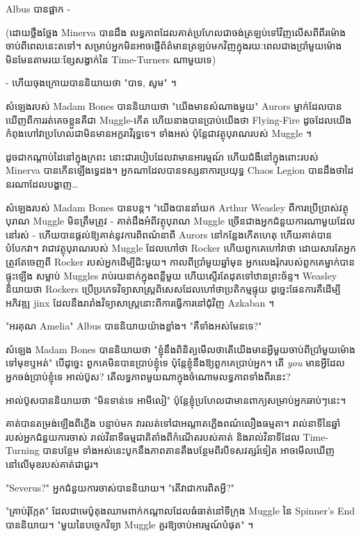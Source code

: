 Albus បានផ្អាក -

(ដោយថ្លឹងថ្លែង Minerva បានដឹង លទ្ធភាពដែលគាត់ប្រហែលជាចង់ត្រឡប់ទៅវិញលើសពីពីរម៉ោងចាប់ពីពេលនេះតទៅ។ សម្រាប់អ្នកមិនអាចផ្ញើព័ត៌មានត្រឡប់មកវិញក្នុងរយៈពេលជាងប្រាំមួយម៉ោង មិនមែនតាមរយៈខ្សែសង្វាក់នៃ Time-Turners ណាមួយទេ)

- ហើយចុងក្រោយបាននិយាយថា "បាទ, សូម" ។

សំឡេងរបស់ Madam Bones បាននិយាយថា "យើងមានសំណាងមួយ" Aurors ម្នាក់ដែលបានឃើញពីការរត់គេចខ្លួនគឺជា Muggle-កើត ហើយនាងបានប្រាប់យើងថា Flying-Fire ដូចដែលយើងកំពុងហៅវាប្រហែលជាមិនមានអក្ខរាវិរុទ្ធទេ។ ទាំងអស់ ប៉ុន្តែជាវត្ថុបុរាណរបស់ Muggle ។

ដូចជាកណ្តាប់ដៃនៅក្នុងក្រពះ នោះជារបៀបដែលវាមានអារម្មណ៍ ហើយជំងឺនៅក្នុងពោះរបស់ Minerva បានកើនឡើងទ្វេដង។ អ្នក​ណា​ដែល​បាន​ទស្សនា​ការ​ប្រយុទ្ធ Chaos Legion បាន​ដឹង​ថា​ដៃ​នរណា​ដែល​បង្ហាញ…

សំឡេងរបស់ Madam Bones បានបន្ត។ "យើងបាននាំយក Arthur Weasley ពីការប្រើប្រាស់វត្ថុបុរាណ Muggle មិនត្រឹមត្រូវ - គាត់ដឹងអំពីវត្ថុបុរាណ Muggle ច្រើនជាងអ្នកជំនួយការណាមួយដែលនៅរស់ - ហើយបានផ្តល់ឱ្យគាត់នូវការពិពណ៌នាពី Aurors នៅកន្លែងកើតហេតុ ហើយគាត់បានបំបែកវា។ វាជាវត្ថុបុរាណរបស់ Muggle ដែលហៅថា Rocker ហើយពួកគេហៅវាថា ដោយសារតែអ្នកត្រូវតែចេញពី Rocker របស់អ្នកដើម្បីជិះមួយ។ កាលពីប្រាំមួយឆ្នាំមុន អ្នកលេងរ៉ុករបស់ពួកគេម្នាក់បានផ្ទុះឡើង សម្លាប់ Muggles រាប់រយនាក់ក្នុងពន្លឺមួយ ហើយស្ទើរតែដុតទៅឋានព្រះច័ន្ទ។ Weasley និយាយថា Rockers ប្រើប្រភេទវិទ្យាសាស្ត្រពិសេសដែលហៅថាប្រតិកម្មផ្ទុយ ដូច្នេះផែនការគឺដើម្បីអភិវឌ្ឍ jinx ដែលនឹងរារាំងវិទ្យាសាស្រ្តនោះពីការធ្វើការនៅជុំវិញ Azkaban ។

"អរគុណ Amelia" Albus បាននិយាយយ៉ាងខ្លាំង។ "គឺទាំងអស់មែនទេ?"

សំឡេង Madam Bones បាននិយាយថា "ខ្ញុំនឹងពិនិត្យមើលថាតើយើងមានអ្វីមួយចាប់ពីប្រាំមួយម៉ោងទៅមុខឬអត់" បើដូច្នេះ ពួកគេមិនបានប្រាប់ខ្ញុំទេ ប៉ុន្តែខ្ញុំនឹងឱ្យពួកគេប្រាប់អ្នក។ តើ \emph{you} មានអ្វីដែលអ្នកចង់ប្រាប់ខ្ញុំទេ អាល់ប៊ូស? តើ​លទ្ធភាព​មួយ​ណា​ក្នុង​ចំណោម​លទ្ធភាព​ទាំង​ពីរ​នេះ?

អាល់ប៊ូសបាននិយាយថា "មិនទាន់ទេ អាមីលៀ" ប៉ុន្តែខ្ញុំប្រហែលជាមានពាក្យសម្រាប់អ្នកឆាប់ៗនេះ។

គាត់បានតម្រង់ឡើងពីភ្លើង បន្ទាប់មក វារលត់ទៅជាអណ្តាតភ្លើងពណ៌លឿងធម្មតា។ រាល់នាទីនៃឆ្នាំរបស់អ្នកជំនួយការចាស់ រាល់វិនាទីធម្មជាតិតាំងពីកំណើតរបស់គាត់ និងរាល់វិនាទីដែល Time-Turning បានបន្ថែម ទាំងអស់នេះបូកនឹងភាពតានតឹងបន្ថែមពីរបីទសវត្សរ៍ទៀត អាចមើលឃើញនៅលើមុខរបស់គាត់ជាជួរ។

"Severus?" អ្នកជំនួយការចាស់បាននិយាយ។ "តើវាជាការពិតអ្វី?"

"គ្រាប់រ៉ុក្កែត" ដែលជាមេប៉ូតុងឈាមពាក់កណ្តាលដែលធំធាត់នៅទីក្រុង Muggle នៃ Spinner's End បាននិយាយ។ "មួយនៃបច្ចេកវិទ្យា Muggle គួរឱ្យចាប់អារម្មណ៍បំផុត" ។

